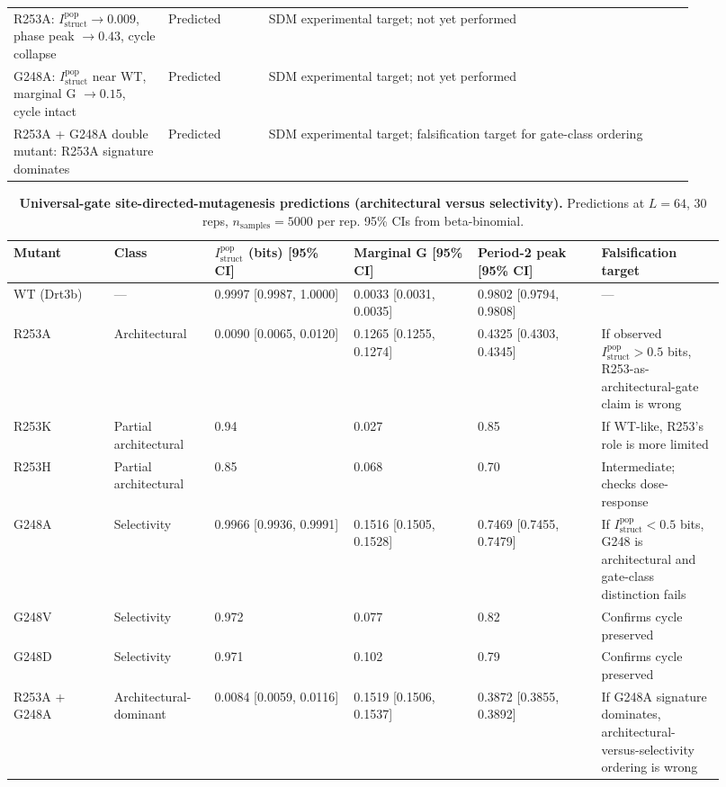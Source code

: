 \documentclass[aps,prx,reprint,amsmath,amssymb,floatfix,superscriptaddress,nofootinbib]{revtex4-2}
\theoremstyle{plain-thm}
\theoremstyle{definition-thm}
\newcommand{\Istructpop}{I_{\mathrm{struct}}^{\mathrm{pop}}}
\begin{document}
\begin{table}
\begin{tabular}{p{0.20\linewidth} p{0.13\linewidth} p{0.55\linewidth}}
R253A: $\Istructpop \to 0.009$, phase peak $\to 0.43$, cycle collapse & Predicted & SDM experimental target; not yet performed \\
G248A: $\Istructpop$ near WT, marginal G $\to 0.15$, cycle intact & Predicted & SDM experimental target; not yet performed \\
R253A + G248A double mutant: R253A signature dominates & Predicted & SDM experimental target; falsification target for gate-class ordering \\
\bottomrule
\end{tabular}
\end{table}


\begin{table}
\caption{\textbf{Universal-gate site-directed-mutagenesis predictions (architectural versus selectivity).} Predictions at $L = 64$, 30 reps, $n_{\mathrm{samples}} = 5000$ per rep. 95\% CIs from beta-binomial.}
\label{tab:sdm_predictions}
\begin{tabular}{p{0.13\linewidth} p{0.13\linewidth} p{0.18\linewidth} p{0.16\linewidth} p{0.16\linewidth} p{0.16\linewidth}}
\toprule
Mutant & Class & $\Istructpop$ (bits) [95\% CI] & Marginal G [95\% CI] & Period-2 peak [95\% CI] & Falsification target \\
\midrule
WT (Drt3b) & --- & 0.9997 [0.9987, 1.0000] & 0.0033 [0.0031, 0.0035] & 0.9802 [0.9794, 0.9808] & --- \\
R253A & Architectural & 0.0090 [0.0065, 0.0120] & 0.1265 [0.1255, 0.1274] & 0.4325 [0.4303, 0.4345] & If observed $\Istructpop > 0.5$ bits, R253-as-architectural-gate claim is wrong \\
R253K & Partial architectural & 0.94 & 0.027 & 0.85 & If WT-like, R253's role is more limited \\
R253H & Partial architectural & 0.85 & 0.068 & 0.70 & Intermediate; checks dose-response \\
G248A & Selectivity & 0.9966 [0.9936, 0.9991] & 0.1516 [0.1505, 0.1528] & 0.7469 [0.7455, 0.7479] & If $\Istructpop < 0.5$ bits, G248 is architectural and gate-class distinction fails \\
G248V & Selectivity & 0.972 & 0.077 & 0.82 & Confirms cycle preserved \\
G248D & Selectivity & 0.971 & 0.102 & 0.79 & Confirms cycle preserved \\
R253A + G248A & Architectural-dominant & 0.0084 [0.0059, 0.0116] & 0.1519 [0.1506, 0.1537] & 0.3872 [0.3855, 0.3892] & If G248A signature dominates, architectural-versus-selectivity ordering is wrong \\
\bottomrule
\end{tabular}
\end{table}
\end{document}
